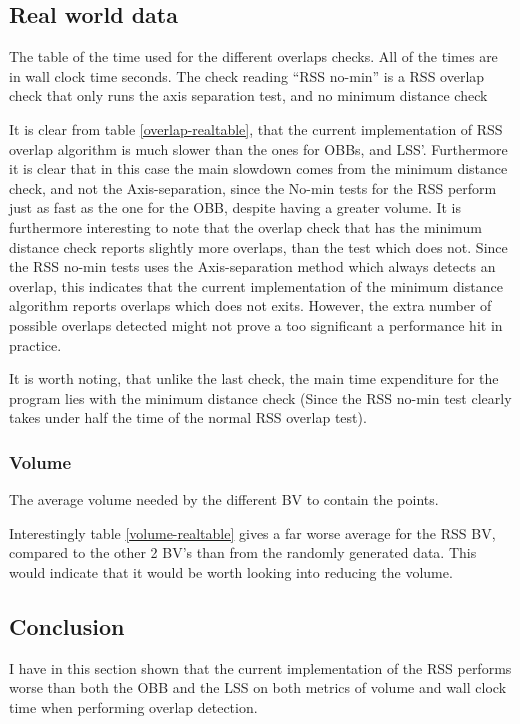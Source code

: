 \subsection{Real world data}
\label{realWorldData}
\begin{table}

\caption{\label{overlap-realtable}The table of the time used for the
  different overlaps checks. All of the times are in wall clock time seconds. The
  check reading ``RSS no-min'' is a RSS overlap check that only runs the axis separation test, and no minimum distance check}
\end{table}

It is clear from table \ref{overlap-realtable}, that the current implementation of RSS overlap algorithm is much slower than the ones for  OBBs, and  LSS'. Furthermore it is clear that in this case the main slowdown comes from the minimum distance check, and not the Axis-separation, since the No-min tests for the RSS perform just as fast as the one for the OBB, despite having a greater volume. It is furthermore interesting to note that the overlap check that has the minimum distance check reports slightly more overlaps, than the test which does not. Since the RSS no-min tests uses the Axis-separation method which always detects an overlap, this indicates that the current implementation of the minimum distance algorithm reports overlaps which does not exits. However, the extra number of possible overlaps detected might not prove a too significant a performance hit in practice.

It is worth noting, that unlike the last check, the main time expenditure for the program lies with the minimum distance check (Since the RSS no-min test clearly takes under half the time of the normal RSS overlap test).

\subsubsection{Volume}
\begin{table}

\caption{\label{volume-realtable} The average volume needed by the
  different BV to contain the points.}
\end{table}

Interestingly table \ref{volume-realtable} gives a far worse average for the RSS BV, compared to the other 2 BV's than from the randomly generated data. This would indicate that it would be worth looking into reducing the volume.

\subsection{Conclusion}
I have in this section shown that the current implementation of the RSS performs worse than both the OBB and the LSS on both metrics of volume and wall clock time when performing overlap detection.

